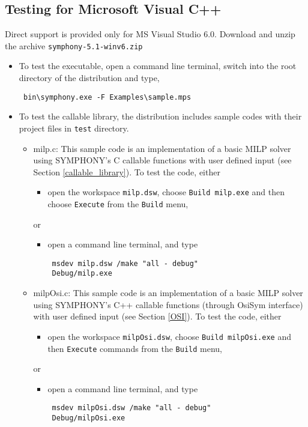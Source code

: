 \subsection{Testing for Microsoft Visual C++}
Direct support is provided only for MS Visual Studio 6.0. 
Download and unzip the archive \texttt{symphony-5.1-winv6.zip} 
\begin{itemize}
\item To test the executable, open a command line terminal,  
switch into the root directory of the distribution and type, 
{\color{Brown}
\begin{verbatim}
 bin\symphony.exe -F Examples\sample.mps
 \end{verbatim}
}
\item To test the callable library, the distribution includes sample codes with
their project files in \texttt{test} directory. 
\begin{itemize}
\item milp.c: This sample code is an implementation of a basic MILP solver 
using SYMPHONY's C callable functions with user defined input 
(see Section \ref{callable_library}). 
To test the code, either 

\begin{itemize}
\item open the workspace \texttt{milp.dsw}, choose \texttt{Build milp.exe}
and then choose \texttt{Execute} from the \texttt{Build} menu, 
\end{itemize}
or
\begin{itemize}
\item open a command line terminal, and type 
{\color{Brown}
\begin{verbatim}
 msdev milp.dsw /make "all - debug"
 Debug/milp.exe
 \end{verbatim}
}
\end{itemize}
\item  milpOsi.c: This sample code is an implementation of a basic MILP 
solver using SYMPHONY's C++ callable functions (through OsiSym interface)
with user defined input (see Section \ref{OSI}). To test the code, either 
\begin{itemize}
\item open the workspace \texttt{milpOsi.dsw}, 
choose \texttt{Build milpOsi.exe} and then 
\texttt{Execute} commands from the \texttt{Build} menu, 
\end{itemize}
or
\begin{itemize}
\item open a command line terminal, and type 
{\color{Brown}
\begin{verbatim}
 msdev milpOsi.dsw /make "all - debug"
 Debug/milpOsi.exe
 \end{verbatim}
}
\end{itemize}
\end{itemize}
\end{itemize}
